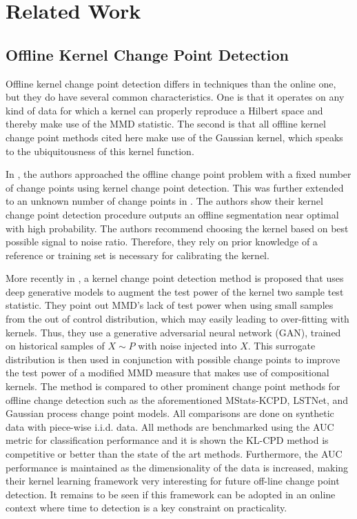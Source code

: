 \section{Related Work}
\label{related_works}

\subsection{Offline Kernel Change Point Detection}
Offline kernel change point detection differs in techniques than the online one, but they do have several common characteristics. One is that it operates on any kind of data for which a kernel can properly reproduce a Hilbert space and thereby make use of the MMD statistic. The second is that all offline kernel change point methods cited here make use of the Gaussian kernel, which speaks to the ubiquitousness of this kernel function. 

In \cite{harchaoui2007retrospective}, the authors approached the offline change point problem with a fixed number of change points using kernel change point detection. This was further extended to an unknown number of change points in \cite{arlot2012kernel}. The authors show their kernel change point detection procedure outputs an offline segmentation near optimal with high probability. The authors recommend choosing the kernel based on best possible signal to noise ratio. Therefore, they rely on prior knowledge of a reference or training set is necessary for calibrating the kernel. 

More recently in \cite{chang2019kernel}, a  kernel change point detection method is proposed that uses deep generative models to augment the test power of the kernel two sample test statistic. They point out MMD's lack of test power when using small samples from the out of control distribution, which may easily leading to over-fitting with kernels. Thus, they use a generative adversarial neural network (GAN), trained on historical samples of $X \sim  P$  with noise injected into $X$. This surrogate distribution is then used in conjunction with possible change points to improve the test power of a modified MMD measure that makes use of compositional kernels. The method is compared to other prominent change point methods for offline change detection such as the aforementioned MStats-KCPD, LSTNet, and Gaussian process change point models. All comparisons are done on synthetic data with piece-wise i.i.d. data. All methods are benchmarked using the AUC metric for classification performance and it is shown the KL-CPD method is competitive or better than the state of the art methods.  Furthermore, the AUC performance is maintained as the dimensionality of the data is increased, making their kernel learning framework very interesting for future off-line change point detection. It remains to be seen if this framework can be adopted in an online context where time to detection is a key constraint on practicality.

